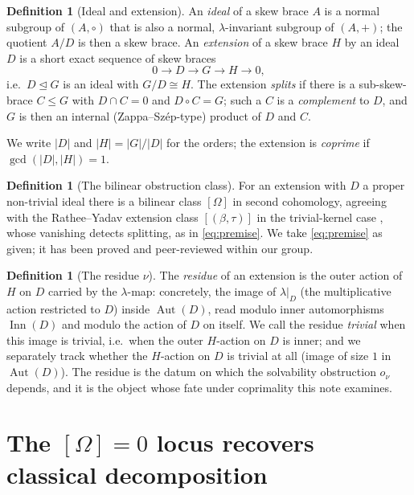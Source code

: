 \documentclass[11pt]{article}
\theoremstyle{definition}
\newtheorem{definition}[theorem]{Definition}
\newcommand{\Aut}{\operatorname{Aut}}
\newcommand{\Inn}{\operatorname{Inn}}
\newcommand{\gcdd}{\gcd}
\begin{document}
\begin{definition}[Ideal and extension]
An \emph{ideal} of a skew brace $A$ is a normal subgroup of $(A,\circ)$ that is also a normal,
$\lambda$-invariant subgroup of $(A,+)$; the quotient $A/D$ is then a skew brace. An
\emph{extension} of a skew brace $H$ by an ideal $D$ is a short exact sequence of skew braces
\[
0\longrightarrow D \longrightarrow G \longrightarrow H \longrightarrow 0 ,
\]
i.e.\ $D\trianglelefteq G$ is an ideal with $G/D\cong H$. The extension \emph{splits} if there
is a sub-skew-brace $C\le G$ with $D\cap C=0$ and $D\circ C = G$; such a $C$ is a
\emph{complement} to $D$, and $G$ is then an internal (Zappa--Sz\'ep-type) product of $D$
and $C$.
\end{definition}

We write $|D|$ and $|H|=|G|/|D|$ for the orders; the extension is \emph{coprime} if
$\gcdd(|D|,|H|)=1$.

\begin{definition}[The bilinear obstruction class]
For an extension with $D$ a proper non-trivial ideal there is a bilinear class $[\Omega]$
in second cohomology, agreeing with the Rathee--Yadav extension class $[(\beta,\tau)]$ in the
trivial-kernel case \cite{RY}, whose vanishing detects splitting, as in \eqref{eq:premise}.
We take \eqref{eq:premise} as given; it has been proved and peer-reviewed within our group.
\end{definition}

\begin{definition}[The residue $\nu$]\label{def:residue}
The \emph{residue} of an extension is the outer action of $H$ on $D$ carried by the
$\lambda$-map: concretely, the image of $\lambda|_D$ (the multiplicative action restricted to
$D$) inside $\Aut(D)$, read modulo inner automorphisms $\Inn(D)$ and modulo the action of $D$
on itself. We call the residue \emph{trivial} when this image is trivial, i.e.\ when the
outer $H$-action on $D$ is inner; and we separately track whether the $H$-action on $D$ is
trivial at all (image of size $1$ in $\Aut(D)$). The residue is the datum on which the
solvability obstruction $o_\nu$ depends, and it is the object whose fate under coprimality
this note examines.
\end{definition}

\section{The $[\Omega]=0$ locus recovers classical decomposition}\label{sec:locus}
\end{document}
